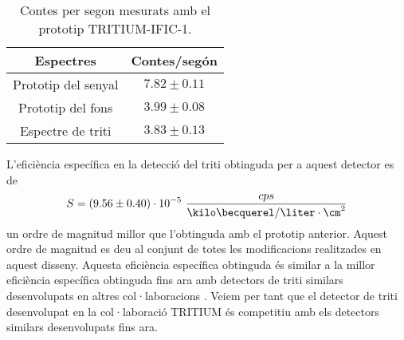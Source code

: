\begin{table}[htbp]
\centering{}%
\begin{tabular}{cc}
\toprule 
Espectres & Contes/segón  \tabularnewline
\midrule
\midrule 
Prototip del senyal & $7.82 \pm 0.11$ \tabularnewline
Prototip del fons & $3.99 \pm 0.08$ \tabularnewline  
Espectre de triti & $3.83 \pm 0.13$ \tabularnewline
\bottomrule
\end{tabular}
\caption{Contes per segon mesurats amb el prototip TRITIUM-IFIC-1.}
\label{tab:ContesPerSegonTRITIUMIFIC1}
\end{table}

L'eficiència específica en la detecció del triti obtinguda per a aquest detector es de
$$S = (9.56 \pm 0.40)\cdot{} 10^{-5}~\frac{cps}{\kilo\becquerel/\liter \cdot{} \cm^{2}}$$
un ordre de magnitud millor que l'obtinguda amb el prototip anterior. Aquest ordre de magnitud es deu al conjunt de totes les modificacions realitzades en aquest disseny. Aquesta eficiència específica obtinguda és similar a la millor eficiència específica obtinguda fins ara amb detectors de triti similars desenvolupats en altres col·laboracions \cite{Hofstetter1, Hofstetter2}. Veiem per tant que el detector de triti desenvolupat en la col·laboració TRITIUM és competitiu amb els detectors similars desenvolupats fins ara.